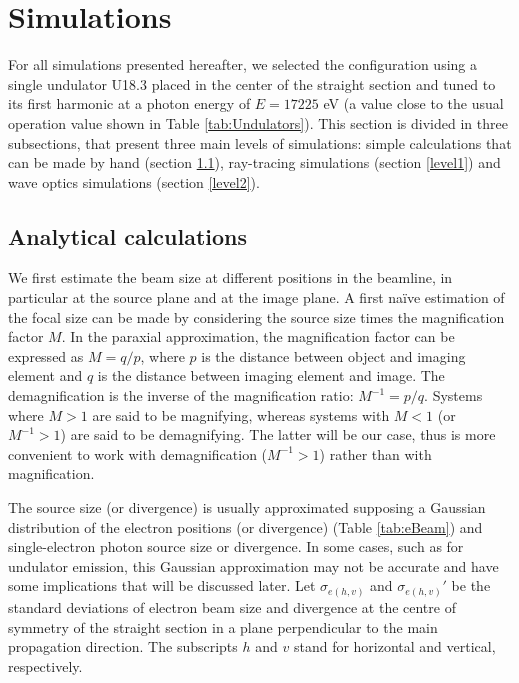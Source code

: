 \documentclass{iucr}              %
\begin{document}
\section{Simulations}
\label{Simulations}

For all simulations presented hereafter, we selected the configuration using a single undulator U18.3 placed in the center of the straight section and tuned to its first harmonic at a photon energy of $E=17225$ eV (a value close to the usual operation value shown in Table \ref{tab:Undulators}). This section is divided in three subsections, that present three main levels of simulations: simple calculations that can be made by hand (section \ref{level0}), ray-tracing simulations (section \ref{level1}) and wave optics simulations (section \ref{level2}).   

\subsection{Analytical calculations}
\label{level0}

We first estimate the beam size at different positions in the beamline, in particular at the source plane and at the image plane. A first na{\"{i}}ve estimation of the focal size can be made by considering the source size times the magnification factor $M$. In the paraxial approximation, the magnification factor can be expressed as $M=q/p$, where $p$ is the distance between object and imaging element and $q$ is the distance between imaging element and image. The demagnification is the inverse of the magnification ratio: $M^{-1}=p/q$. Systems where $M>1$ are said to be magnifying, whereas systems with $M<1$ (or $M^{-1}>1$) are said to be demagnifying. The latter will be our case, thus is more convenient to work with demagnification ($M^{-1}>1$) rather than with magnification. 

The source size (or divergence) is usually approximated supposing a Gaussian distribution of the electron positions (or divergence) (Table \ref{tab:eBeam}) and single-electron photon source size or divergence. In some cases, such as for undulator emission, this Gaussian approximation may not be accurate and have some implications that will be discussed later. Let $\sigma_{e(h,v)}$ and $\sigma_{e(h,v)}'$ be the standard deviations of electron beam size and divergence  at the centre of  symmetry of the straight section in a plane perpendicular to the main propagation direction. The subscripts $h$ and $v$ stand for horizontal and vertical, respectively. 
\end{document}
